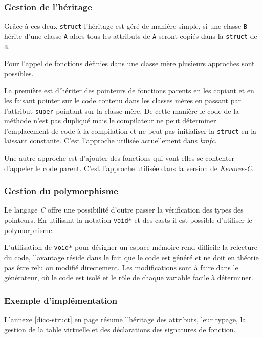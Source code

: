 \subsubsection{Gestion de l'héritage}

Grâce à ces deux \texttt{struct} l'héritage est géré de manière simple, si une classe \texttt{B} hérite d'une classe \texttt{A} alors tous les attributs de \texttt{A} seront copiés dans la \texttt{struct} de \texttt{B}.

Pour l'appel de fonctions définies dans une classe mère plusieurs approches sont possibles.

La première est d'hériter des pointeurs de fonctions parents en les copiant et en les faisant pointer sur le code contenu dans les classes mères en passant par l'attribut \texttt{super} pointant sur la classe mère. De cette manière le code de la méthode n'est pas dupliqué mais le compilateur ne peut déterminer l'emplacement de code à la compilation et ne peut pas initialiser la \texttt{struct} en la laissant constante. C'est l'approche utilisée actuellement dans \emph{kmfc}.

Une autre approche est d'ajouter des fonctions qui vont elles se contenter d'appeler le code parent. C'est l'approche utilisée dans la version de \emph{Kevoree-C}.

\subsubsection{Gestion du polymorphisme}

Le langage \emph{C} offre une possibilité d'outre passer la vérification des types des pointeurs. En utilisant la notation \texttt{void*} et des casts il est possible d'utiliser le polymorphisme.

L'utilisation de \texttt{void*} pour désigner un espace mémoire rend difficile la relecture du code, l'avantage réside dans le fait que le code est généré et ne doit en théorie pas être relu ou modifié directement. Les modifications sont à faire dans le générateur, où le code est isolé et le rôle de chaque variable facile à déterminer.

\subsubsection{Exemple d'implémentation}

L'annexe \ref{dico-struct} en page \pageref{dico-struct} résume l'héritage des attributs, leur typage, la gestion de la table virtuelle et des déclarations des signatures de fonction.

